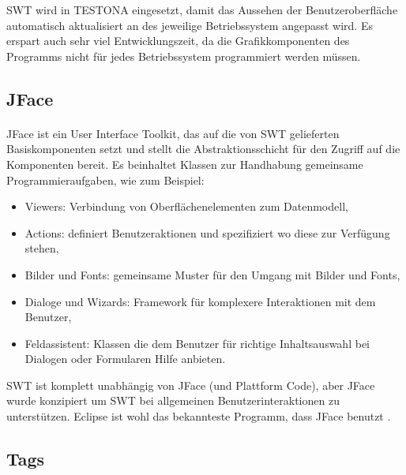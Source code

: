 SWT wird in TESTONA eingesetzt, damit das Aussehen der Benutzeroberfläche automatisch aktualisiert an des jeweilige Betriebssystem angepasst wird. Es erspart auch sehr viel Entwicklungszeit, da die Grafikkomponenten des Programms nicht für jedes Betriebssystem programmiert werden müssen.





\subsection{JFace}
\paragraph{}
JFace ist ein User Interface Toolkit, das auf die von SWT gelieferten Basiskomponenten setzt und stellt die Abstraktionsschicht für den Zugriff auf die Komponenten bereit. Es beinhaltet Klassen zur Handhabung gemeinsame Programmieraufgaben, wie zum Beispiel:


\begin{itemize}
\item Viewers: Verbindung von Oberflächenelementen zum Datenmodell,
\item Actions: definiert Benutzeraktionen und spezifiziert wo diese zur Verfügung stehen,
\item Bilder und Fonts: gemeinsame Muster für den Umgang mit Bilder und Fonts,
\item Dialoge und Wizards: Framework für komplexere Interaktionen mit dem Benutzer,
\item Feldassistent: Klassen die dem Benutzer für richtige Inhaltsauswahl bei Dialogen oder Formularen Hilfe anbieten.
\end{itemize}


SWT ist komplett unabhängig von JFace (und Plattform Code), aber JFace wurde konzipiert um SWT  bei allgemeinen Benutzerinteraktionen zu unterstützen. Eclipse ist wohl das bekannteste Programm, dass JFace benutzt \cite{EclipseHelp}.\\



\subsection{Tags}\label{sub.Tags}
\paragraph{}

